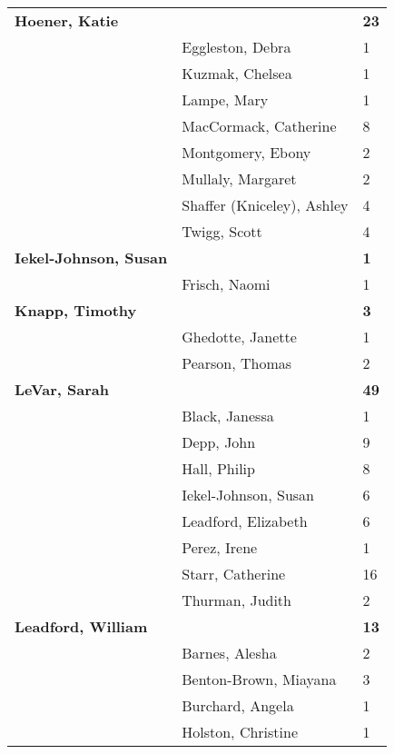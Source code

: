 \documentclass{article}\usepackage[]{graphicx}\usepackage[]{color}
\begin{document}
{\begin{longtable} { >{\raggedright}p{}|p{}p{}}
  \textbf{Hoener, Katie} &  & \hspace{2cm}\textbf{23} \\ 
   \rowcolor[gray]{0.90} & Eggleston, Debra & 1 \\ 
   \rowcolor[gray]{0.90} & Kuzmak, Chelsea & 1 \\ 
   \rowcolor[gray]{0.90} & Lampe, Mary & 1 \\ 
   & MacCormack, Catherine & 8 \\ 
   & Montgomery, Ebony & 2 \\ 
   & Mullaly, Margaret & 2 \\ 
   \rowcolor[gray]{0.90} & Shaffer (Kniceley), Ashley & 4 \\ 
   \rowcolor[gray]{0.90} & Twigg, Scott & 4 \\ 
   \rowcolor[gray]{0.90}\textbf{Iekel-Johnson, Susan} &  & \hspace{2cm}\textbf{1} \\ 
   & Frisch, Naomi & 1 \\ 
  \textbf{Knapp, Timothy} &  & \hspace{2cm}\textbf{3} \\ 
   & Ghedotte, Janette & 1 \\ 
   \rowcolor[gray]{0.90} & Pearson, Thomas & 2 \\ 
   \rowcolor[gray]{0.90}\textbf{LeVar, Sarah} &  & \hspace{2cm}\textbf{49} \\ 
   \rowcolor[gray]{0.90} & Black, Janessa & 1 \\ 
   & Depp, John & 9 \\ 
   & Hall, Philip & 8 \\ 
   & Iekel-Johnson, Susan & 6 \\ 
   \rowcolor[gray]{0.90} & Leadford, Elizabeth & 6 \\ 
   \rowcolor[gray]{0.90} & Perez, Irene & 1 \\ 
   \rowcolor[gray]{0.90} & Starr, Catherine & 16 \\ 
   & Thurman, Judith & 2 \\ 
  \textbf{Leadford, William} &  & \hspace{2cm}\textbf{13} \\ 
   & Barnes, Alesha & 2 \\ 
   \rowcolor[gray]{0.90} & Benton-Brown, Miayana & 3 \\ 
   \rowcolor[gray]{0.90} & Burchard, Angela & 1 \\ 
   \rowcolor[gray]{0.90} & Holston, Christine & 1 \\ 

\end{longtable}}
\end{document}
